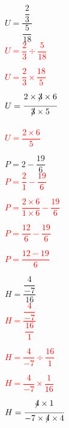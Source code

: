 \documentclass[a4paper,11pt]{article}
\begin{document}


$ U = \dfrac{\dfrac{2}{3}}{\dfrac{5}{18}}$\\

\textcolor{red} {$ U = \dfrac{2}{3} \div \dfrac{5}{18}$ \\}

\textcolor{red} {$ U = \dfrac{2}{3} \times \dfrac{18}{5}$ \\}

\textcolor{red} {$ U = \dfrac{2 \times\xout{ 3} \times 6}{\xout{3} \times 5}  $ \\}

\textcolor{red} {$ U = \dfrac{2 \times 6}{ 5}  $ \\}


\columnbreak

$P = 2 - \dfrac{19}{6}$\\

\textcolor{red} { $P = \dfrac{2}{1} - \dfrac{19}{6}$ \\}

\textcolor{red} { $P = \dfrac{2 \times 6}{1 \times 6} - \dfrac{19}{6}$ \\}

\textcolor{red} { $P = \dfrac{12}{6} - \dfrac{19}{6}$ \\}

\textcolor{red} { $P = \dfrac{12- 19}{6} $ \\}



$H = \dfrac{\dfrac{4}{-7}}{16}$\\

\textcolor{red} {$H = \dfrac{\dfrac{4}{-7}}{\dfrac{16}{1}}$\\}

\textcolor{red} {$H = \dfrac{4}{-7} \div \dfrac{16}{1}$\\}

\textcolor{red} {$H = \dfrac{4}{-7} \times \dfrac{1}{16}$\\}

\textcolor{red} {$H = \dfrac{\xout{4} \times 1}{-7 \times \xout{4} \times 4} $\\}

\end{document}
